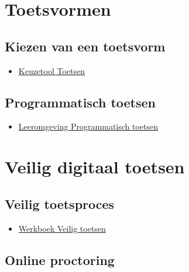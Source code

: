 \documentclass[
  letterpaper,
  DIV=11,
  numbers=noendperiod]{scrreprt}
\providecommand{\tightlist}{%
  \setlength{\itemsep}{0pt}\setlength{\parskip}{0pt}}\usepackage{longtable,booktabs,array}
\begin{document}

\hypertarget{toetsvormen}{%
\chapter{Toetsvormen}\label{toetsvormen}}

\hypertarget{kiezen-van-een-toetsvorm}{%
\section{Kiezen van een toetsvorm}\label{kiezen-van-een-toetsvorm}}

\begin{itemize}
\tightlist
\item
  \href{https://werkgroep-toetsen-op-afstand.github.io/keuzetool-toetsen/}{Keuzetool
  Toetsen}
\end{itemize}

\hypertarget{programmatisch-toetsen}{%
\section{Programmatisch toetsen}\label{programmatisch-toetsen}}

\begin{itemize}
\tightlist
\item
  \href{https://www.programmatischtoetsen.nl}{Leeromgeving
  Programmatisch toetsen}
\end{itemize}


\hypertarget{veilig-digitaal-toetsen}{%
\chapter{Veilig digitaal toetsen}\label{veilig-digitaal-toetsen}}

\hypertarget{veilig-toetsproces}{%
\section{Veilig toetsproces}\label{veilig-toetsproces}}

\begin{itemize}
\tightlist
\item
  \href{https://www.surf.nl/werkboek-veilig-toetsen}{Werkboek Veilig
  toetsen}
\end{itemize}

\hypertarget{online-proctoring}{%
\section{Online proctoring}\label{online-proctoring}}
\end{document}
